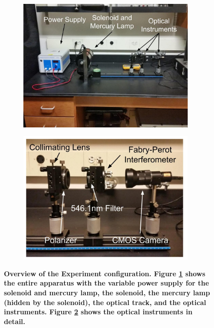 \documentclass[twocolumn]{article}
\begin{document}
	\begin{figure}
		\centering
		\begin{subfigure}{0.5\textwidth}
			\includegraphics[width = 0.98\textwidth]{Images/ExperimentOverview.jpg}
			\caption{}
			\label{subfig:Overview}
			
		\end{subfigure}%
		\begin{subfigure}{0.5\textwidth}
				\includegraphics[width = 0.98\textwidth]{Images/OpticsRail.jpg}
				\caption{}
				\label{subfig:OpticsRail}
				
		\end{subfigure}%
		\caption{\textbf{Overview of the Experiment configuration. Figure \ref{subfig:Overview} shows the entire apparatus with the variable power supply for the solenoid and mercury lamp, the solenoid, the mercury lamp (hidden by the solenoid), the optical track, and the optical instruments. Figure \ref{subfig:OpticsRail} shows the optical instruments in detail.}}
		\label{fig:ContextView}
	\end{figure}
	
\end{document}
